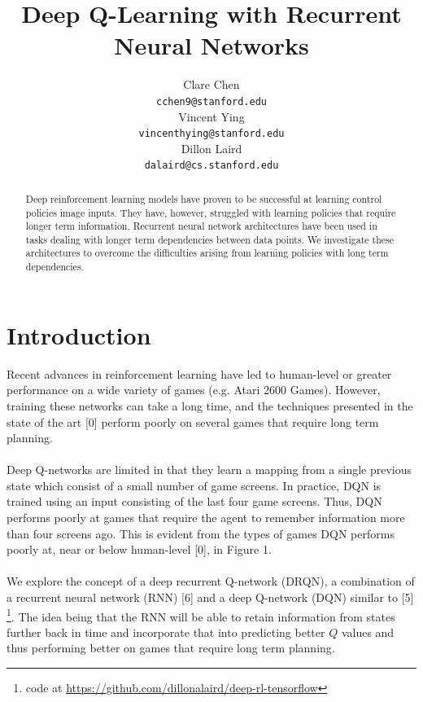 \documentclass{article}
\title{Deep Q-Learning with Recurrent Neural Networks}
\author{
  Clare Chen \\
  \texttt{cchen9@stanford.edu} \\
  \And
  Vincent Ying \\
  \texttt{vincenthying@stanford.edu} \\
  \And
  Dillon Laird \\
  \texttt{dalaird@cs.stanford.edu} \\
}
\begin{document}

\maketitle

\begin{abstract}
  Deep reinforcement learning models have proven to be successful at learning
  control policies image inputs. They have, however, struggled with learning
  policies that require longer term information. Recurrent neural network
  architectures have been used in tasks dealing with longer term dependencies
  between data points. We investigate these architectures to overcome the
  difficulties arising from learning policies with long term dependencies.
\end{abstract}


\section{Introduction}
    Recent advances in reinforcement learning have led to human-level or greater
    performance on a wide variety of games (e.g. Atari 2600 Games). However,
    training these networks can take a long time, and the techniques presented in
    the state of the art [0] perform poorly on several games that require long
    term planning. \\
    \\
    Deep Q-networks are limited in that they learn a mapping from a single
    previous state which consist of a small number of game screens. In practice,
    DQN is trained using an input consisting of the last four game screens. Thus,
    DQN performs poorly at games that require the agent to remember information
    more than four screens ago. This is evident from the types of games DQN performs
    poorly at, near or below human-level [0], in Figure 1. \\
    \\
    We explore the concept of a deep recurrent Q-network (DRQN), a combination of
    a recurrent neural network (RNN) [6] and a deep Q-network (DQN) similar to [5]
    \footnote{code at \url{https://github.com/dillonalaird/deep-rl-tensorflow}}.
    The idea being that the RNN will be able to retain information from states
    further back in time and incorporate that into predicting better $Q$ values
    and thus performing better on games that require long term planning. \\
\end{document}
